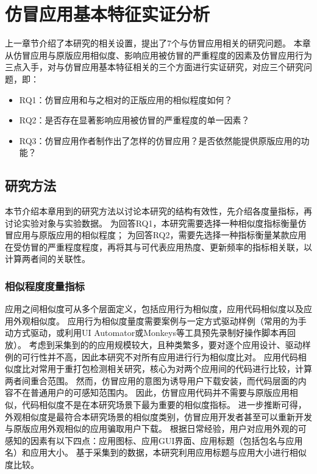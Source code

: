 \chapter{仿冒应用基本特征实证分析}
\label{chp:discoveries_basic}

上一章节介绍了本研究的相关设置，提出了7个与仿冒应用相关的研究问题。
本章从仿冒应用与原版应用相似度、影响应用被仿冒的严重程度的因素及仿冒应用行为三点入手，对与仿冒应用基本特征相关的三个方面进行实证研究，对应三个研究问题，即：

\begin{itemize}
    \item RQ1：仿冒应用和与之相对的正版应用的相似程度如何？
    \item RQ2：是否存在显著影响应用被仿冒的严重程度的单一因素？
    \item RQ3：仿冒应用作者制作出了怎样的仿冒应用？是否依然能提供原版应用的功能？
\end{itemize}

\section{研究方法}
\label{sec:measure_selection}

本节介绍本章用到的研究方法以讨论本研究的结构有效性，先介绍各度量指标，再讨论实验对象与实验数据。
为回答RQ1，本研究需要选择一种相似度指标衡量仿冒应用与原版应用的相似程度；
为回答RQ2，需要先选择一种指标衡量某款应用在受仿冒的严重程度程度，再将其与可代表应用热度、更新频率的指标相关联，以计算两者间的关联性。

\subsection{相似程度度量指标}

应用之间相似度可从多个层面定义，包括应用行为相似度，应用代码相似度以及应用外观相似度。
应用行为相似度量度需要案例与一定方式驱动样例（常用的为手动方式驱动，或利用UI Automator或Monkeys等工具预先录制好操作脚本再回放）。
考虑到采集到的的应用规模较大，且种类繁多，要对逐个应用设计、驱动样例的可行性并不高，因此本研究不对所有应用进行行为相似度比对。
应用代码相似度比对常用于重打包检测相关研究，核心为对两个应用间的代码进行比较，计算两者间重合范围。
然而，仿冒应用的意图为诱导用户下载安装，而代码层面的内容不在普通用户的可感知范围内。
因此，仿冒应用代码并不需要与原版应用相似，代码相似度不是在本研究场景下最为重要的相似度指标。
进一步推断可得，外观相似度是最符合本研究场景的相似度类别，仿冒应用开发者甚至可以重新开发与原版应用外观相似的应用骗取用户下载。
根据日常经验，用户对应用外观的可感知的因素有以下四点：应用图标、应用GUI界面、应用标题（包括包名与应用名）和应用大小。
基于采集到的数据，本研究利用应用标题与应用大小进行相似度比较。

